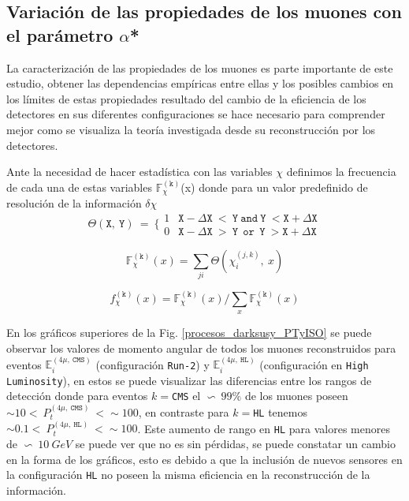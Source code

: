 \subsection{Variación de las propiedades de los muones con el parámetro $\alpha$*}
La caracterización de las propiedades de los muones es parte importante de este estudio, obtener las dependencias empíricas entre ellas y los posibles cambios en los límites de estas propiedades resultado del cambio de la eficiencia de los detectores en sus diferentes configuraciones se hace necesario para comprender mejor como se visualiza la teoría investigada desde su reconstrucción por los detectores.



Ante la necesidad de hacer estadística con las variables $\chi$ definimos la frecuencia de cada una de estas variables $\mathbb{F}_\chi^{(\mathtt{k})}$(x) donde para un valor predefinido de resolución de la información $\delta \chi$
\begin{equation}
\mathtt{\Theta(X,~Y)} ~ = ~ \Bigg\{\begin{matrix}
1 & \mathtt{X-\Delta X ~<~Y ~and~Y~ < X+\Delta X}\\
0 & \mathtt{X-\Delta X ~>~Y ~~or~~Y~ > X+\Delta X}
\end{matrix} 
\end{equation}

\begin{equation}
\mathbb{F}_\chi^{(\mathtt{k})} (x)= \sum_{ji} \mathtt{\Theta}(\chi_i^{(j,k)},~x)
\end{equation}

\begin{equation}
f_\chi^{(\mathtt{k})} (x)= \mathbb{F}_\chi^{(\mathtt{k})} (x)/ \sum_x \mathbb{F}_\chi^{(\mathtt{k})} (x)
\end{equation}






En los gráficos superiores de la Fig. \ref{procesos_darksusy_PTyISO} se puede observar los valores de momento angular de todos los muones reconstruidos para eventos $\mathbb{E}_i^{(4\mu,~\mathtt{CMS})}$ (configuración \texttt{Run-2}) y $\mathbb{E}_i^{(4\mu,~\mathtt{HL})}$ (configuración en \texttt{High Luminosity}), en estos se puede visualizar las diferencias entre los rangos de detección donde para eventos $k=$\texttt{CMS} el $\backsim ~ 99\%$ de los muones poseen $\sim 10  < ~ P_t^{(4\mu,~\mathtt{CMS})} ~ <\sim 100$, en contraste para $k=$\texttt{HL} tenemos $\sim 0.1 < ~ P_t^{(4\mu,~\mathtt{HL})} ~ < \sim 100$. Este aumento de rango en \texttt{HL} para valores menores de $\backsim ~ 10~GeV$ se puede ver que no es sin pérdidas, se puede constatar un cambio en la forma de los gráficos, esto es debido a que la inclusión de nuevos sensores en la configuración \texttt{HL} no poseen la misma eficiencia en la reconstrucción de la información.

